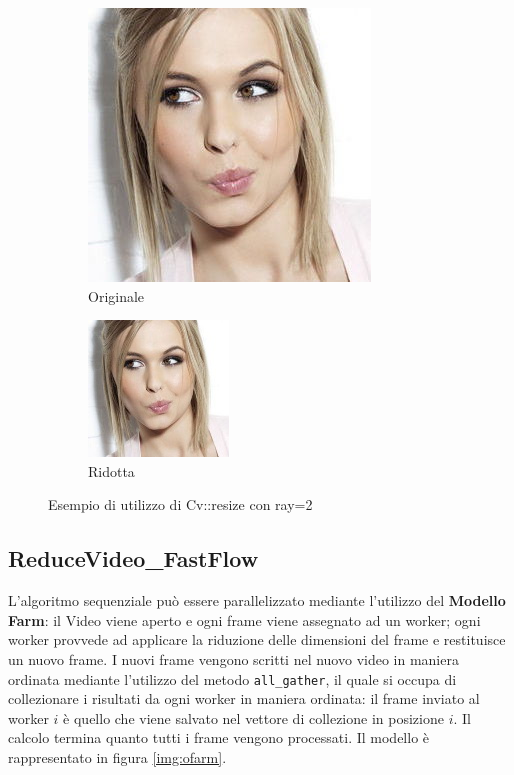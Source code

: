 \documentclass[12pt]{article}
\begin{document}
\begin{figure}[h]
\begin{subfigure}{.55\textwidth}
  \centering
  \includegraphics[scale=.42,keepaspectratio]{original.jpg}
  \caption{Originale}
  \label{fig:tisc}
\end{subfigure} 
\begin{subfigure}{.55\textwidth}
  \centering
  \includegraphics[scale=.42,keepaspectratio]{resize.jpg}
  \caption{Ridotta}
  \label{fig:ftsec}
\end{subfigure}
\caption{Esempio di utilizzo di Cv::resize con ray=2}
\label{img:evi}
\end{figure}




\subsection{ReduceVideo\_FastFlow}
L'algoritmo sequenziale pu\`o essere parallelizzato mediante l'utilizzo del \textbf{Modello Farm}: il Video viene aperto e ogni frame viene assegnato ad un worker; ogni worker provvede ad applicare la riduzione delle dimensioni del frame e restituisce un nuovo frame. I nuovi frame vengono scritti nel nuovo video in maniera ordinata mediante l'utilizzo del metodo \texttt{all\_gather}, il quale si occupa di collezionare i risultati da ogni worker in maniera ordinata: il frame inviato al worker $i$ \`e quello che viene salvato nel vettore di collezione in posizione $i$. Il calcolo termina quanto tutti i frame vengono processati. Il modello \`e rappresentato in figura \ref{img:ofarm}.
\end{document}
